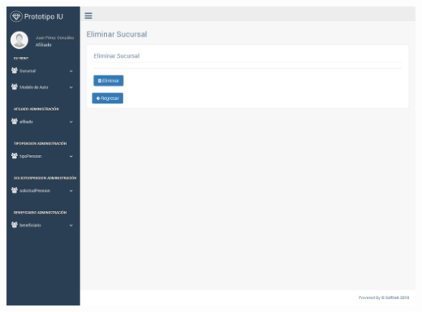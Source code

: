 \documentclass[10pt, letterpaper]{report}
\begin{document}
\includegraphics[width=\linewidth]{ui-prototype/SucursalServices/EliminarSucursalPage.png}

%

\clearpage

\printglossary
\end{document}
